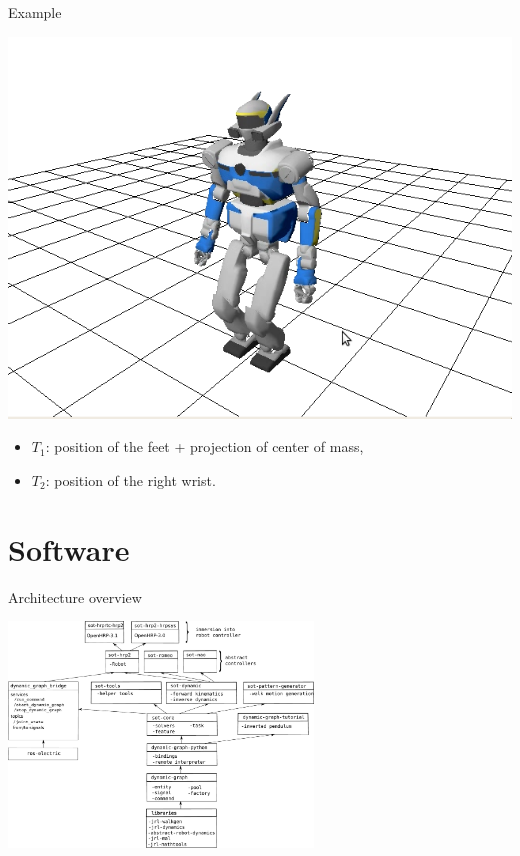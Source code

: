 \begin{frame} {Example}
\parbox {.49\linewidth} {
  \includegraphics[width=\linewidth]{figures/sot.png}
}
\parbox {.5\linewidth} {
  \begin{itemize}
  \item $T_1$: position of the feet + projection of center of mass,
  \item $T_2$: position of the right wrist.
  \end{itemize}
}
\end {frame}

\section {Software}

\begin{frame} {Architecture overview}
\centerline {
  \includegraphics [height=6cm] {figures/sot-architecture.pdf}
}
\end{frame}

